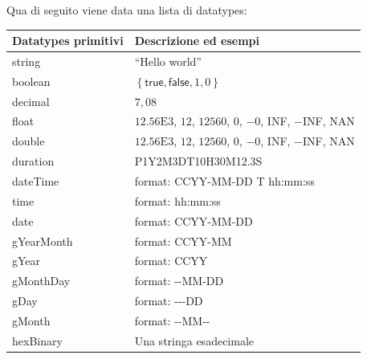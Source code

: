 \documentclass[a4paper]{article}
\newcommand{\dquotes}[1]{``#1''}
\begin{document}
	Qua di seguito viene data una lista di datatypes:\newpage
	\begin{table}[!htp]
		\centering
		\begin{tabular}{@{} l | l @{}}
			\toprule
			Datatypes primitivi & Descrizione ed esempi \\
			\midrule
			\textsf{string}		& \dquotes{Hello world} \\
			\textsf{boolean}	& $\left\{\textsf{true}, \textsf{false}, 1, 0\right\}$ \\
			\textsf{decimal}	& $7,08$ \\
			\textsf{float}		& $12.56\mathrm{E}3$, \hspace{0.5em} $12$, \hspace{0.5em} $12560$, \hspace{0.5em} $0$, \hspace{0.5em} $-0$, \hspace{0.5em} INF, \hspace{0.5em} $-$INF, \hspace{0.5em} NAN \\
			\textsf{double}		& $12.56\mathrm{E}3$, \hspace{0.5em} $12$, \hspace{0.5em} $12560$, \hspace{0.5em} $0$, \hspace{0.5em} $-0$, \hspace{0.5em} INF, \hspace{0.5em} $-$INF, \hspace{0.5em} NAN \\
			\textsf{duration}	& P1Y2M3DT10H30M12.3S \\
			\textsf{dateTime}	& \textsf{format}: \textsf{CCYY-MM-DD T hh:mm:ss} \\
			\textsf{time}		& \textsf{format}: \textsf{hh:mm:ss} \\
			\textsf{date}		& \textsf{format}: \textsf{CCYY-MM-DD} \\
			\textsf{gYearMonth}	& \textsf{format}: \textsf{CCYY-MM} \\
			\textsf{gYear}		& \textsf{format}: \textsf{CCYY} \\
			\textsf{gMonthDay}	& \textsf{format}: \textsf{-}\textsf{-}\textsf{MM-DD} \\
			\textsf{gDay}		& \textsf{format}: \textsf{-}\textsf{-}\textsf{-}\textsf{DD} \\
			\textsf{gMonth}		& \textsf{format}: \textsf{-}\textsf{-}\textsf{MM}\textsf{-}\textsf{-} \\
			\textsf{hexBinary}	& Una stringa esadecimale \\

\end{tabular}
\end{table}
\end{document}
